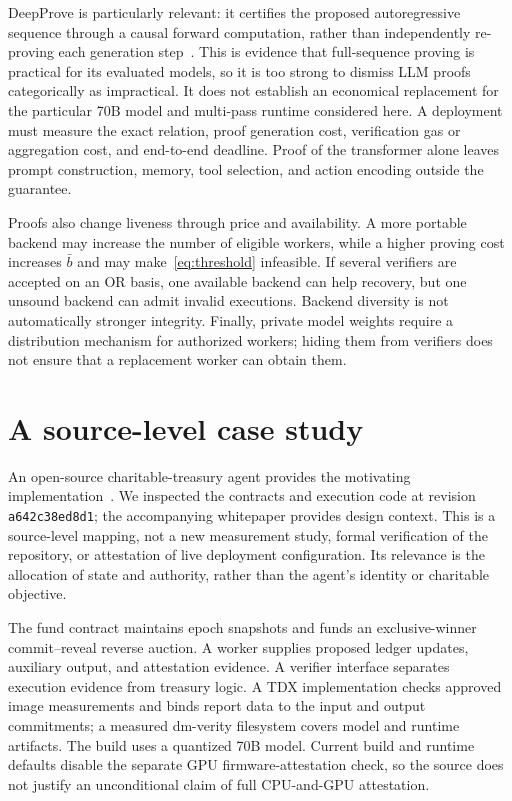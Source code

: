 \documentclass[10pt,letterpaper]{article}
\begin{document}
DeepProve is particularly relevant: it certifies the proposed autoregressive sequence through a causal forward computation, rather than independently re-proving each generation step~\citep{deepprove2026}. This is evidence that full-sequence proving is practical for its evaluated models, so it is too strong to dismiss LLM proofs categorically as impractical. It does not establish an economical replacement for the particular 70B model and multi-pass runtime considered here. A deployment must measure the exact relation, proof generation cost, verification gas or aggregation cost, and end-to-end deadline. Proof of the transformer alone leaves prompt construction, memory, tool selection, and action encoding outside the guarantee.

Proofs also change liveness through price and availability. A more portable backend may increase the number of eligible workers, while a higher proving cost increases $\bar b$ and may make~\eqref{eq:threshold} infeasible. If several verifiers are accepted on an OR basis, one available backend can help recovery, but one unsound backend can admit invalid executions. Backend diversity is not automatically stronger integrity. Finally, private model weights require a distribution mechanism for authorized workers; hiding them from verifiers does not ensure that a replacement worker can obtain them.

\section{A source-level case study}
\label{sec:case}
An open-source charitable-treasury agent provides the motivating implementation~\citep{implementation2026,russell2026,essay2026}. We inspected the contracts and execution code at revision \texttt{a642c38ed8d1}; the accompanying whitepaper provides design context. This is a source-level mapping, not a new measurement study, formal verification of the repository, or attestation of live deployment configuration. Its relevance is the allocation of state and authority, rather than the agent's identity or charitable objective.

The fund contract maintains epoch snapshots and funds an exclusive-winner commit--reveal reverse auction. A worker supplies proposed ledger updates, auxiliary output, and attestation evidence. A verifier interface separates execution evidence from treasury logic. A TDX implementation checks approved image measurements and binds report data to the input and output commitments; a measured dm-verity filesystem covers model and runtime artifacts. The build uses a quantized 70B model. Current build and runtime defaults disable the separate GPU firmware-attestation check, so the source does not justify an unconditional claim of full CPU-and-GPU attestation.
\end{document}
